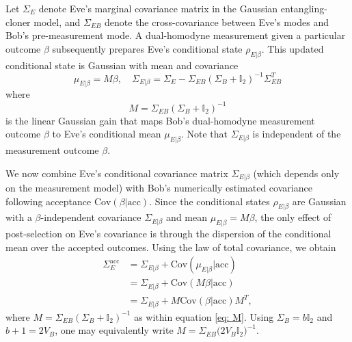 ﻿\documentclass[12pt]{article}
\begin{document}
Let $\Sigma_E$ denote Eve's marginal covariance matrix in the Gaussian entangling-cloner model, and $\Sigma_{EB}$ denote the cross-covariance between Eve's modes and Bob's pre-measurement mode. A dual-homodyne measurement given a particular outcome $\beta$ subsequently prepares Eve's conditional state $\rho_{E|\beta}$. This updated conditional state is Gaussian with mean and covariance
\begin{equation}
  \label{eq: Eve conditional mean and cov}
  \mu_{E|\beta} = M \beta, \quad \Sigma_{E|\beta} = \Sigma_E - \Sigma_{EB}(\Sigma_B + \mathbb{I}_2)^{-1}\Sigma_{EB}^T
\end{equation}
where
\begin{equation}
  \label{eq: M}
  M = \Sigma_{EB}(\Sigma_B + \mathbb{I}_2)^{-1}
\end{equation}
is the linear Gaussian gain that maps Bob's dual-homodyne measurement outcome $\beta$ to Eve's conditional mean $\mu_{E|\beta}$. Note that $\Sigma_{E|\beta}$ is independent of the measurement outcome $\beta$.

We now combine Eve's conditional covariance matrix $\Sigma_{E|\beta}$ (which depends only on the measurement model) with Bob's numerically estimated covariance following acceptance $\text{Cov}(\beta|\text{acc})$. Since the conditional states $\rho_{E|\beta}$ are Gaussian with a $\beta$-independent covariance $\Sigma_{E|\beta}$ and mean $\mu_{E|\beta}=M\beta$, the only effect of post-selection on Eve's covariance is through the dispersion of the conditional mean over the accepted outcomes. Using the law of total covariance, we obtain
\begin{align}
  \label{eq: Sigma_E acc}
  \Sigma_E^{\text{acc}}
  &= \Sigma_{E|\beta} + \text{Cov}\left(\mu_{E|\beta}|\text{acc}\right) \\
  &= \Sigma_{E|\beta} + \text{Cov}\left(M\beta|\text{acc}\right) \\
  &= \Sigma_{E|\beta} + M\text{Cov}(\beta|\text{acc})M^T ,
\end{align}
where $M=\Sigma_{EB}(\Sigma_B+\mathbb{I}_2)^{-1}$ as within equation \eqref{eq: M}. Using $\Sigma_B=b\mathbb{I}_2$ and $b+1=2V_B$, one may equivalently write $M=\Sigma_{EB}\big(2V_B\mathbb{I}_2\big)^{-1}$.
\end{document}

